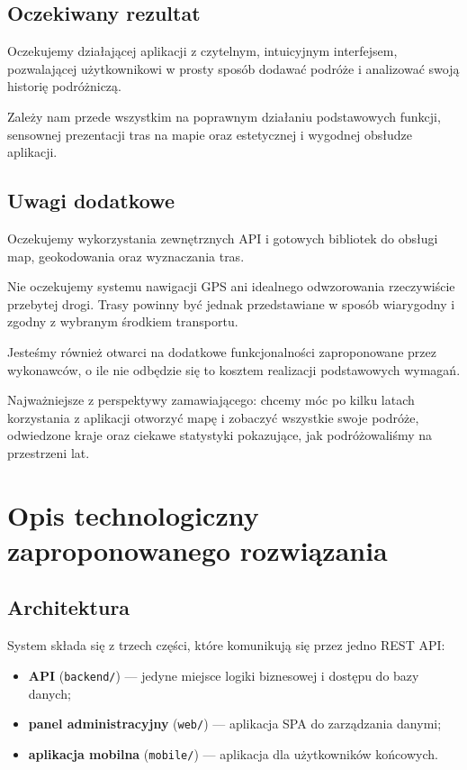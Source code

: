 \documentclass[a4paper,12pt]{article}
\begin{document}
\subsection{Oczekiwany rezultat}

Oczekujemy działającej aplikacji z czytelnym, intuicyjnym interfejsem, pozwalającej użytkownikowi w
prosty sposób dodawać podróże i analizować swoją historię podróżniczą.

Zależy nam przede wszystkim na poprawnym działaniu podstawowych funkcji, sensownej prezentacji tras
na mapie oraz estetycznej i wygodnej obsłudze aplikacji.

\subsection{Uwagi dodatkowe}

Oczekujemy wykorzystania zewnętrznych API i gotowych bibliotek do obsługi map, geokodowania oraz
wyznaczania tras.

Nie oczekujemy systemu nawigacji GPS ani idealnego odwzorowania rzeczywiście przebytej drogi. Trasy
powinny być jednak przedstawiane w sposób wiarygodny i zgodny z wybranym środkiem transportu.

Jesteśmy również otwarci na dodatkowe funkcjonalności zaproponowane przez wykonawców, o ile nie
odbędzie się to kosztem realizacji podstawowych wymagań.

Najważniejsze z perspektywy zamawiającego: chcemy móc po kilku latach korzystania z aplikacji
otworzyć mapę i zobaczyć wszystkie swoje podróże, odwiedzone kraje oraz ciekawe statystyki
pokazujące, jak podróżowaliśmy na przestrzeni lat.

\newpage

\section{Opis technologiczny zaproponowanego rozwiązania}

\subsection{Architektura}

System składa się z trzech części, które komunikują się przez jedno REST API:

\begin{itemize}
  \item \textbf{API} (\texttt{backend/}) --- jedyne miejsce logiki biznesowej i dostępu do bazy danych;
  \item \textbf{panel administracyjny} (\texttt{web/}) --- aplikacja SPA do zarządzania danymi;
  \item \textbf{aplikacja mobilna} (\texttt{mobile/}) --- aplikacja dla użytkowników końcowych.
\end{itemize}
\end{document}
